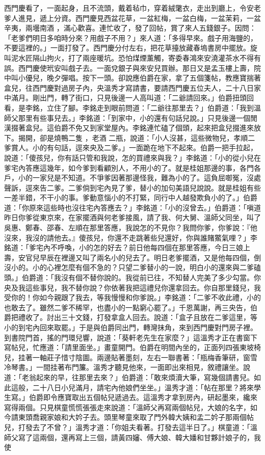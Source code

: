 西門慶看了，一面起身，且不流頭，戴着毡巾，穿着絨氅衣，走出到廳上，令安老爹人進見，遞上分資。西門慶見西盆花草，一盆紅梅，一盆白梅，一盆茉莉，一盆辛夷，兩壜南酒 ，滿心歡喜。連忙收了，發了回帖，賞了來人五錢銀子。因問：「老爹們明日多咱時分來？用戲子不用？」來人道：「多得早來。戲子用海鹽的，不要這裡的。」一面打發了。西門慶分付左右，把花草擡放藏春塢書房中擺放。旋叫泥水匠隔山拘火，打了兩座暖坑。恐怕煤煙薰觸，寄委春鴻來安澆灌茶水不得有誤。西門慶使玳安叫戲子去。一面兌銀子與來安兒買辦。那日又是孟玉樓上壽，院中叫小優兒，晚夕彈唱。按下一頭。卻說應伯爵在家，拿了五個箋帖，教應寶揣著盒兒，往西門慶對過房子內，央溫秀才寫請書，要請西門慶五位夫人，二十八日家中滿月。剛出門，轉了街口，只見後邊一人高叫道：「二爺請回來。」伯爵扭頭回看，是李銘，立住了腳。李銘走到眼前問道：「二爺往那里去？」伯爵道：「我到溫師父那里有些事兒去。」李銘道：「到家中，小的還有句話兒說。」只見後邊一個閒漢掇著盒兒。這伯爵不免又到家堂屋內。李銘連忙磕了個頭，起來把盒兒掇進來放下。揭開，卻是燒鴨二隻 ，老酒 二瓶，說道：「小人沒甚，這些微物兒，孝順二爹賞人。小的有句話，逕來央及二爹。」一面跪在地下不起來。伯爵一把手拉起，說道：「傻孩兒，你有話只管和我說，怎的買禮來與我？」李銘道：「小的從小兒在爹宅內答應這幾年，如今爹到看顧別人，不用小的了。就是桂姐那邊的事，各門各戶，小的一家兒是不知道。不爭爹因著那邊怪我，難為小的了。這負屈啣冤，沒處聲訴，逕來告二爹。二爹倘到宅內見了爹，替小的加句美語兒說說。就是桂姐有些一差半錯，不干小的事。爹動意惱小的不打緊，同行中人越發欺負小的了。」伯爵道：「你原來這些時也沒往宅內答應去？」李銘道：「小的沒曾去。」伯爵道：「嗔道昨日你爹從東京來，在家擺酒與何老爹接風，請了我、何大舅、溫師父同坐，叫了吳惠、鄭春、邵春、左順在那里答應，我說怎的不見你？我問你爹，你爹說：『他沒來，我沒的請他去。』傻孩兒，你還不走跳著些兒還好，你與誰賭鱉氣哩？」李銘道：「爹宅內不呼喚，小的怎的好去？前日他每四個在那里答應，今日三娘上壽，安官兒早辰在裡邊又叫了兩名小的兒去了。明日老爹擺酒，又是他每四個，倒沒小的。小的心裡怎麼有個不急的？只望二爹替小的一說，明白小的還來與二爹磕頭。」伯爵道：「我沒有個不替你說的。我從前已往，不知替人完美了多少勾當。你央及我這些事兒，我不替你說？你依著我把這禮兒你還拿回去。你自那里錢兒，我受你的！你如今親跟了我去，等我慢慢和你爹說。」李銘道：「二爹不收此禮，小的也敢去了。雖然二爹不稀罕，也盡小的一點窮心罷了。」千恩萬謝，再三央告，伯爵把禮收了。討出三十文錢，打發拿盒人回去。說道：「盒子且放在二爹這里，等小的到宅內回來取罷。」于是與伯爵同出門，轉灣抹角，來到西門慶對門房子裡。到書院門首，搖的門環兒響，說道：「葵軒老先生在家麼？」這溫秀才正在書窗下寫帖兒，忙應道：「請里面坐。」畫童開門。伯爵在明間內坐的，正面列四張東坡椅兒，挂著一軸莊子惜寸陰圖。兩邊貼著墨刻，左右一聯書著：「瓶梅香筆研，窗雪冷琴書。」一間挂著布門簾。溫秀才聽見他來，一面即出來相見，敘禮讓坐。說道：「老翁起來的早，往那里去來？」伯爵道：「敢來煩瀆大筆，寫幾個請書兒。如此這般，二十八日小兒滿月，請宅內他娘們坐坐。」溫秀才道：「帖在那里？將來學生寫。」伯爵即令應寶取出五個帖兒遞過去。這溫秀才拿到房內，研起墨來，纔來寫得兩個。只見棋童慌慌張張走來說道：「溫師父再寫兩個帖兒，大娘的名字，如今請東頭喬親家娘和大妗子去。頭里琴童來取了門外韓大姨和孟二妗子那兩個帖兒，打發去了不曾？」溫秀才道：「你姐夫看著。打發去這半日了。」棋童道：「溫師父寫了這兩個，還再寫上三個，請黃四嬸、傅大娘、韓大嬏和甘夥計娘子的，我使